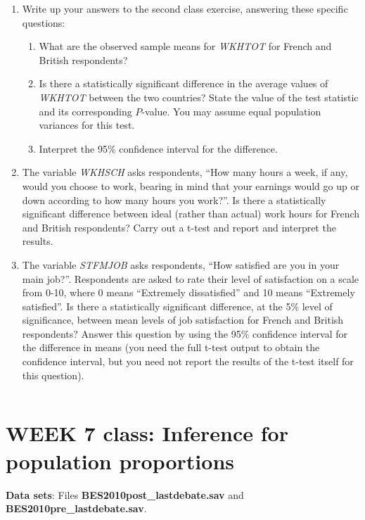 \begin{enumerate}
\item
Write up your answers to the second class exercise, answering these specific
questions:
\begin{enumerate}
\item
What are the observed sample means for \emph{WKHTOT} for French and British respondents?
\item
Is there a statistically significant difference in the average values
of \emph{WKHTOT} between the two countries? State the value of the test statistic and its
corresponding $P$-value. You may assume equal population variances for this test.
\item
Interpret the 95\% confidence interval for the difference.
\end{enumerate}
\item
The variable \emph{WKHSCH} asks respondents,
``How many hours a week, if any, would you choose to work, bearing in
mind that your earnings would go up or down according to
how many hours you work?''. Is there a statistically significant difference between ideal
(rather than actual) work hours for French and British respondents? Carry out a t-test
and report and interpret the results.
\item
The variable \emph{STFMJOB} asks respondents,
``How satisfied are you in your main job?''. Respondents are asked to rate their
level of satisfaction on a scale from 0-10, where
0 means ``Extremely dissatisfied'' and 10 means ``Extremely satisfied''. Is there a statistically
significant difference, at the 5\% level of significance, between mean levels of job satisfaction
for French and British respondents? Answer this question by using the 95\% confidence interval for
the difference in means (you need the full t-test output to obtain the confidence interval, but you
need not report the results of the t-test itself for this question).
\end{enumerate}



\newpage
$\;$
\newpage


\section[Week 7: Inference for proportions]{WEEK 7 class: Inference for population proportions}

\textbf{Data sets}: Files
\textbf{BES2010post\_lastdebate.sav} and
\textbf{BES2010pre\_lastdebate.sav}.

